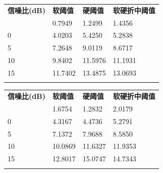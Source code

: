 \documentclass{morningstar}
\begin{document}
\begin{table}[htb]
    \centering
    \begin{tabular}{|p{3cm}|p{3cm}|p{3cm}|p{3cm}|}
    \thickhline
    \textbf{信噪比(dB)} & \textbf{软阈值} & \textbf{硬阈值} & \textbf{软硬折中阈值} \\
    \thickhline
    -5               & 0.7949       & 1.2499       & 1.4356          \\
    \hline
    0                & 4.0203       & 5.4250       & 5.2838          \\
    \hline
    5                & 7.2648       & 9.0119       & 8.6717          \\
    \hline
    10               & 9.8402      & 11.5976      & 11.1931         \\
    \hline
    15               & 11.7402      & 13.4875      & 13.0693         \\
    \thickhline
    \end{tabular}
\end{table}

\begin{table}[htb]
    \centering
    \begin{tabular}{|p{3cm}|p{3cm}|p{3cm}|p{3cm}|}
    \thickhline
    \textbf{信噪比(dB)} & \textbf{软阈值} & \textbf{硬阈值} & \textbf{软硬折中阈值} \\
    \thickhline
    -5               & 1.6754       & 1.2832       & 2.0179          \\
    \hline
    0                & 4.3167       & 4.4736       & 5.2791          \\
    \hline
    5                & 7.1372       & 7.9688       & 8.5850          \\
    \hline
    10               & 10.0869      & 11.6327      & 11.9353         \\
    \hline
    15               & 12.8017      & 15.0747      & 14.7343         \\
    \thickhline
    \end{tabular}
\end{table}
\end{document}
